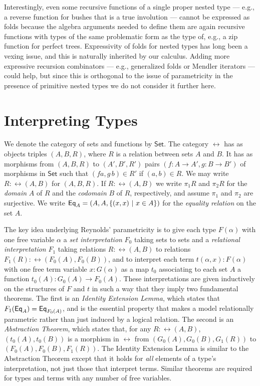 \documentclass[runningheads]{llncs}
\newcommand{\set}{\mathsf{Set}}
\begin{document}
Interestingly, even some recursive functions of a single proper nested
type --- e.g., a reverse function for bushes that is a true involution
--- cannot be expressed as folds because the algebra arguments needed
to define them are again recursive functions with types of the same
problematic form as the type of, e.g., a zip function for perfect
trees.  Expressivity of folds for nested types has long been a vexing
issue, and this is naturally inherited by our calculus.  Adding more
expressive recursion combinators --- e.g., generalized folds or
Mendler iterators --- could help, but since this is orthogonal to the
issue of parametricity in the presence of primitive nested types we do
not consider it further here.

\vspace*{-0.15in}

\section{Interpreting Types}\label{sec:type-interp}

\vspace*{-0.1in}

We denote the category of sets and functions by $\set$. The category
$\rel$ has as objects triples $(A,B,R)$, where $R$ is a relation
between sets $A$ and $B$.  It has as morphisms from $(A,B,R)$ to
$(A',B',R')$ pairs $(f : A \to A',g : B \to B')$ of morphisms in
$\set$ such that $(f a,g\,b) \in R'$ if $(a,b) \in R$. We may write $R
: \rel(A,B)$ for $(A,B,R)$.  If $R : \rel(A,B)$ we write $\pi_1 R$ and
$\pi_2 R$ for the {\em domain} $A$ of $R$ and the {\em codomain} $B$
of $R$, respectively, and assume $\pi_1$ and $\pi_2$ are
surjective. We write $\mathsf{Eq}_A = (A,A,\{(x,x)~|~ x \in A\})$ for the {\em
  equality relation} on the set $A$.

The key idea underlying Reynolds' parametricity is to give each type
$F(\alpha)$ with one free variable $\alpha$ a {\em set interpretation}
$F_0$ taking sets to sets and a \emph{relational interpretation} $F_1$
taking relations $R : \rel(A,B)$ to relations $F_1 (R) : \rel(F_0 (A),
F_0 (B))$, and to interpret each term $t(\alpha,x) : F(\alpha)$ with
one free term variable $x : G(\alpha)$ as a map $t_0$ associating to
each set $A$ a function $t_0(A) : G_0(A) \to F_0(A)$. These
interpretations are given inductively on the structures of $F$ and $t$
in such a way that they imply two fundamental theorems. The first is
an \emph{Identity Extension Lemma}, which states that $F_1(\mathsf{Eq}_A) =
\mathsf{Eq}_{F_0(A)}$, and is the essential property that makes a model
relationally parametric rather than just induced by a logical
relation. The second is an \emph{Abstraction Theorem}, which states
that, for any $R :\rel(A, B)$, $(t_0(A),t_0(B))$ is a morphism in
$\rel$ from $(G_0(A),G_0(B),G_1(R))$ to $(F_0(A),F_0(B),F_1(R))$. The
Identity Extension Lemma is similar to the Abstraction Theorem except
that it holds for {\em all} elements of a type's interpretation, not
just those that interpret terms.  Similar theorems are required for
types and terms with any number of free variables.
\end{document}
